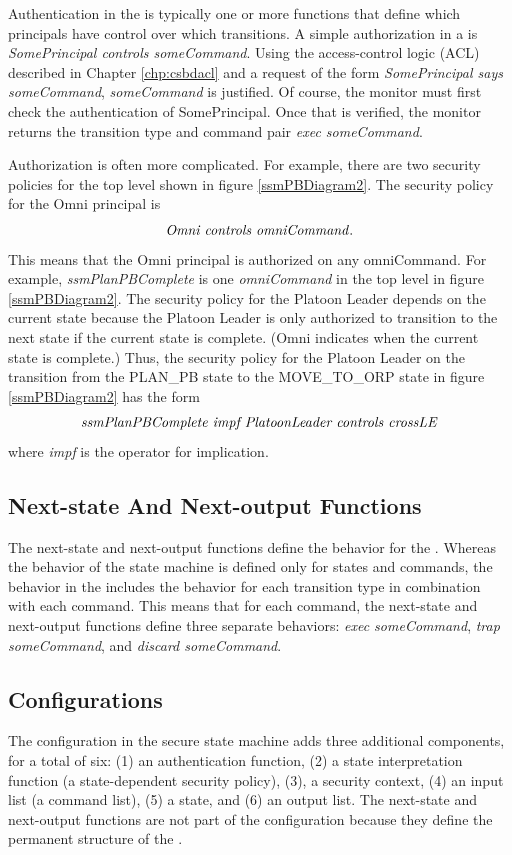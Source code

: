 \documentclass[../../main/main.tex]{subfiles}
\begin{document}
Authentication in the  is typically one or more functions that define which principals have control over which transitions.  A simple authorization in a  is \textit{SomePrincipal controls someCommand}.    Using the access-control logic (ACL) described in Chapter \ref{chp:csbdacl} and a request of the form \textit{SomePrincipal says someCommand}, \textit{someCommand} is justified.  Of course, the monitor must first check the authentication of SomePrincipal.  Once that is verified, the monitor returns the transition type and command pair \textit{exec someCommand}.

Authorization is often more complicated.  For example, there are two security policies for the top level  shown in figure \ref{ssmPBDiagram2}.  The security policy for the Omni principal is
\[\text{\textit{Omni controls omniCommand}}.\]  This means that the Omni principal is authorized on any omniCommand.  For example, \textit{ssmPlanPBComplete} is one \textit{omniCommand} in the top level  in figure \ref{ssmPBDiagram2}.  The security policy for the Platoon Leader depends on the current state because the Platoon Leader is only authorized to transition to the next state if the current state is complete.  (Omni indicates when the current state is complete.)  Thus, the security policy for the Platoon Leader on the transition from the PLAN_PB state to the MOVE_TO_ORP state in figure \ref{ssmPBDiagram2} has the form \[\text{\textit{ssmPlanPBComplete impf PlatoonLeader controls crossLE}}\]where \textit{impf} is the  operator for implication.

\subsection{Next-state And Next-output Functions}
The next-state and next-output functions define the behavior for the .  Whereas the behavior of the state machine is defined only for states and commands, the behavior in the  includes the behavior for each transition type in combination with each command.  This means that for each command, the next-state and next-output functions define three separate behaviors: \textit{exec someCommand}, \textit{trap someCommand}, and \textit{discard someCommand}.  

\subsection{Configurations}
The configuration in the secure state machine adds three additional components, for a total of six: (1) an authentication function, (2) a state interpretation function (a state-dependent security policy), (3), a security context, (4) an input list (a command list), (5) a state, and (6) an output list.   The next-state and next-output functions are not part of the configuration because they define the permanent structure of the .
\end{document}
